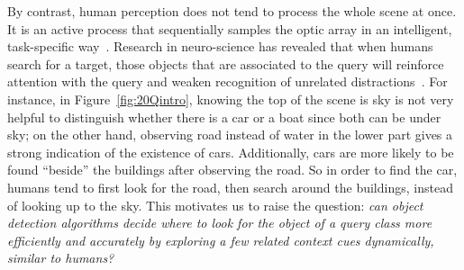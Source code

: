 By contrast, human perception does not tend to process the whole scene at once. It is an active process that sequentially samples the optic array in an intelligent, task-specific way~\cite{najemnik2005optimal}. Research in neuro-science has revealed that when humans search for a target, those objects that are associated to the query will reinforce attention with the query and weaken recognition of unrelated distractions~\cite{moores2003associative}. 
For instance, in Figure~\ref{fig:20Qintro}, knowing the top of the scene is sky is not very helpful to distinguish whether there is a car or a boat since both can be under sky; 
on the other hand, observing road instead of water in the lower part gives a strong indication of the existence of cars. Additionally, cars are more likely to be found ``beside'' the buildings after observing the road. So in order to find the car, humans tend to first look for the road, then search around the buildings, instead of looking up to the sky. %
This motivates us to raise the question: \textit{can object detection algorithms decide where to look for the object of a query class more efficiently and accurately by exploring a few related context cues dynamically, similar to humans?}

